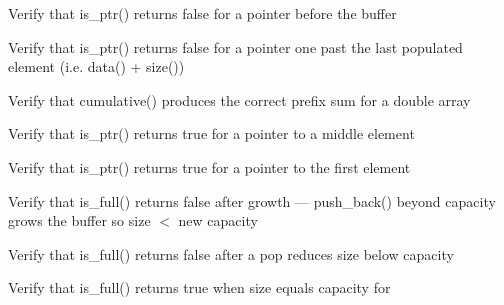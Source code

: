 \begin{DoxyRefList}
%
Verify that is\+\_\+ptr() returns false for a pointer before the buffer  
\item[Global \doxylink{test__array_8cpp_a3f1a8a0f693089d0b591a7b951925a42}{TEST\+\_\+F} (\doxylink{classArrayInitTest}{Array\+Init\+Test}, Is\+Ptr\+False\+For\+One\+Past\+End)]\label{test__test000086}%
%
Verify that is\+\_\+ptr() returns false for a pointer one past the last populated element (i.\+e. data() + size())  
\item[Global \doxylink{test__array_8cpp_a11474363dca7649dfdebf42d8f70a408}{TEST\+\_\+F} (\doxylink{classArrayInitTest}{Array\+Init\+Test}, Cumulative\+Double\+Sum)]\label{test__test000095}%
%
Verify that cumulative() produces the correct prefix sum for a double array  
\item[Global \doxylink{test__array_8cpp_a05688d91eb63c1dcdd026a8b2d0846d6}{TEST\+\_\+F} (\doxylink{classArrayInitTest}{Array\+Init\+Test}, Is\+Ptr\+True\+For\+Middle\+Element)]\label{test__test000084}%
%
Verify that is\+\_\+ptr() returns true for a pointer to a middle element  
\item[Global \doxylink{test__array_8cpp_a80fdb7400030b76c42ea372cbe573e75}{TEST\+\_\+F} (\doxylink{classArrayInitTest}{Array\+Init\+Test}, Is\+Ptr\+True\+For\+First\+Element)]\label{test__test000083}%
%
Verify that is\+\_\+ptr() returns true for a pointer to the first element  
\item[Global \doxylink{test__array_8cpp_acad6314255a35101541502e7242921bc}{TEST\+\_\+F} (\doxylink{classArrayInitTest}{Array\+Init\+Test}, Is\+Full\+False\+After\+Growth)]\label{test__test000082}%
%
Verify that is\+\_\+full() returns false after growth — push\+\_\+back() beyond capacity grows the buffer so size \texorpdfstring{$<$}{<} new capacity  
\item[Global \doxylink{test__array_8cpp_ae7dba4cbda369018bfc7a35a36bf3dce}{TEST\+\_\+F} (\doxylink{classArrayInitTest}{Array\+Init\+Test}, Is\+Full\+False\+After\+Pop\+Back)]\label{test__test000081}%
%
Verify that is\+\_\+full() returns false after a pop reduces size below capacity  
\item[Global \doxylink{test__array_8cpp_afe84312bb95f42ce9058cb18cdccfba3}{TEST\+\_\+F} (\doxylink{classArrayInitTest}{Array\+Init\+Test}, Is\+Full\+True\+When\+Point\+Array\+At\+Capacity)]\label{test__test000080}%
%
Verify that is\+\_\+full() returns true when size equals capacity for   

\end{DoxyRefList}
